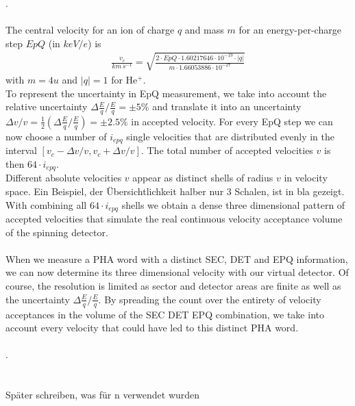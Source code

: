 .
\\ \\
The central velocity for an ion of charge $q$ and mass $m$ for an energy-per-charge step $EpQ$ (in $keV/e$) is
\begin{align*}
\frac{v_c}{km \, s^{-1}} = \sqrt{\frac{2 \cdot EpQ \cdot 1.60217646\cdot10^{-19}\cdot |q|}{m \cdot 1.66053886 \cdot 10^{-27}} }
\end{align*}
with $m = 4 u$ and $|q| = 1$ for $\mathrm{He^{+}}$.\\
To represent the uncertainty in EpQ measurement, we take into account the relative uncertainty $\Delta \frac{E}{q}/\frac{E}{q} = \pm 5\%$ and translate it into an uncertainty $\Delta v / v = \frac{1}{2} \left( \Delta \frac{E}{q}/\frac{E}{q}\right) = \pm 2.5\%$ in accepted velocity. For every EpQ step we can now choose a number of $i_{epq}$ single velocities that are distributed evenly in the interval $\left[ v_c - \Delta v / v, v_c + \Delta v / v \right]$. The total number of accepted velocities $v$ is then $64 \cdot i_{epq}$.
\\
Different absolute velocities $v$ appear as distinct shells of radius $v$ in velocity space.
Ein Beispiel, der Übersichtlichkeit halber nur 3 Schalen, ist in bla gezeigt.
\\
With combining all $64 \cdot i_{epq}$ shells we obtain a dense three dimensional pattern of accepted velocities that simulate the real continuous velocity acceptance volume of the spinning detector.
\\ \\
When we measure a PHA word with a distinct SEC, DET and EPQ information, we can now determine its three dimensional velocity with our virtual detector. Of course, the resolution is limited as sector and detector areas are finite as well as the uncertainty $\Delta \frac{E}{q}/\frac{E}{q}$. By spreading the count over the entirety of velocity acceptances in the volume of the SEC DET EPQ combination, we take into account every velocity that could have led to this distinct PHA word.
\\ \\


.\\ \\ \\
Später schreiben, was für n verwendet wurden
